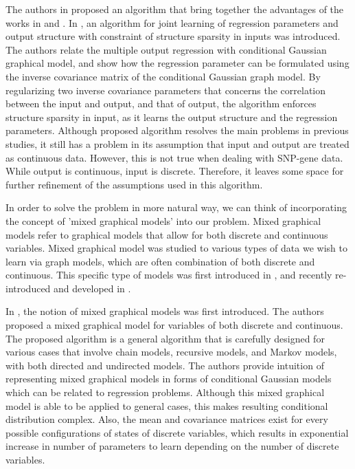\documentclass{article}
\begin{document}
The authors in \cite{sohn2012joint} proposed an algorithm that bring together the advantages of the works in \cite{kim2010tree} and \cite{rothman2010sparse}. In \cite{sohn2012joint}, an algorithm for joint learning of regression parameters and output structure with constraint of structure sparsity in inputs was introduced. The authors relate the multiple output regression with conditional Gaussian graphical model, and show how the regression parameter can be formulated using the inverse covariance matrix of the conditional Gaussian graph model. By regularizing two inverse covariance parameters that concerns the correlation between the input and output, and that of output, the algorithm enforces structure sparsity in input, as it learns the output structure and the regression parameters.
Although proposed algorithm resolves the main problems in previous studies, it still has a problem in its assumption that input and output are treated as continuous data. 
However, this is not true when dealing with SNP-gene data. While output is continuous, input is discrete.
Therefore, it leaves some space for further refinement of the assumptions used in this algorithm.









In order to solve the problem in more natural way, we can think of incorporating the concept of 'mixed graphical models' into our problem.
Mixed graphical models refer to graphical models that allow for both discrete and continuous variables. Mixed graphical model was studied to various types of data we wish to learn via graph models, which are often combination of both discrete and continuous.
This specific type of models was first introduced in \cite{lauritzen1989graphical}, and recently re-introduced and developed in \cite{lee2013structure}.



In \cite{lauritzen1989graphical}, the notion of mixed graphical models was first introduced. The authors proposed a mixed graphical model for variables of both discrete and continuous. The proposed algorithm is a general algorithm that is carefully designed for various cases that involve chain models, recursive models, and Markov models, with both directed and undirected models. The authors provide intuition of representing mixed graphical models in forms of conditional Gaussian models which can be related to regression problems. Although this mixed graphical model is able to be applied to general cases, this makes resulting conditional distribution complex. Also, the mean and covariance matrices exist for every possible configurations of states of discrete variables, which results in exponential increase in number of parameters to learn depending on the number of discrete variables.
\end{document}
